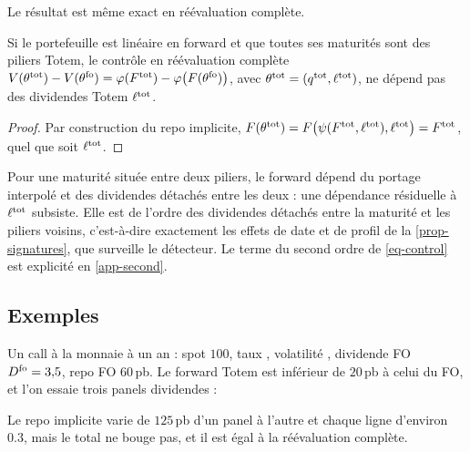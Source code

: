 Le résultat est même exact en réévaluation complète.

\begin{theorem}\label{thm-exact}
Si le portefeuille est linéaire en forward et que toutes ses maturités sont des piliers Totem, le contrôle en
réévaluation complète $V(\theta^{\mathrm{tot}})-V(\theta^{\mathrm{fo}})=\varphi(F^{\mathrm{tot}})-\varphi\bigl(F(\theta^{\mathrm{fo}})\bigr)$, avec
$\theta^{\mathrm{tot}}=(q^{\mathrm{tot}}, \ell^{\mathrm{tot}})$, ne dépend pas des dividendes Totem $\ell^{\mathrm{tot}}$.
\end{theorem}
\begin{proof}
Par construction du repo implicite, $F(\theta^{\mathrm{tot}})=F\bigl(\psi(F^{\mathrm{tot}}, \ell^{\mathrm{tot}}), \ell^{\mathrm{tot}}\bigr)=F^{\mathrm{tot}}$, quel
que soit $\ell^{\mathrm{tot}}$.
\end{proof}

\begin{remark}
Pour une maturité située entre deux piliers, le forward dépend du portage interpolé et des dividendes détachés entre
les deux : une dépendance résiduelle à $\ell^{\mathrm{tot}}$ subsiste. Elle est de l'ordre des dividendes détachés entre la
maturité et les piliers voisins, c'est-à-dire exactement les effets de date et de profil de la
\cref{prop-signatures}, que surveille le détecteur. Le terme du second ordre de \eqref{eq-control} est explicité en
\cref{app-second}.
\end{remark}

\subsection{Exemples}
\begin{example}[Un call]\label{ex-call}
Un call à la monnaie à un an : spot $100$, taux , volatilité , dividende FO $D^{\mathrm{fo}}=\num{3.5}$, repo FO
$60$\,pb. Le forward Totem est inférieur de $20$\,pb à celui du FO, et l'on essaie trois panels dividendes :
\begin{center}\end{center}
Le repo implicite varie de $125$\,pb d'un panel à l'autre et chaque ligne d'environ $\num{0.3}$, mais le total ne
bouge pas, et il est égal à la réévaluation complète.
\end{example}

